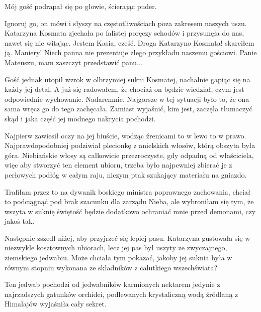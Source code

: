 Mój gość podrapał się po głowie, ścierając puder.

\begin{dialogue}
\ds{} Ignoruj go, on mówi i słyszy na częstotliwościach poza zakresem naszych uszu. \dm{} Katarzyna Kosmata zjechała po falistej poręczy schodów i przysunęła do nas, nawet się nie witając.
\dm{} Jestem Kasia, cześć.
\ds{} Droga Katarzyno Kosmata! \dm{} skarciłem ją. \dm{} Maniery! Niech panna nie prezentuje złego przykładu naszemu gościowi. Panie Mateuszu, mam zaszczyt przedstawić panu...
\end{dialogue}

Gość jednak utopił wzrok w olbrzymiej sukni Kosmatej, nachalnie gapiąc się na każdy jej detal.
A już się radowałem, że chociaż on będzie wiedział, czym jest odpowiednie wychowanie. Nadaremnie.
Najgorsze w tej sytuacji było to, że ona sama wręcz go do tego zachęcała. 
Zamiast wyjaśnić, kim jest, zaczęła tłumaczyć skąd i jaka część jej modnego nakrycia pochodzi.

Najpierw zawiesił oczy na jej biuście, wodząc źrenicami to w lewo to w prawo.
Najprawdopodobniej podziwiał plecionkę z anielskich włosów, którą obszyta była góra.
Niebiańskie włosy są całkowicie przezroczyste, gdy odpadną od właściciela, więc
aby stworzyć ten element ubioru, trzeba było najpewniej zbierać je z perłowych podłóg w całym raju, niczym ptak szukający materiału na gniazdo.
\begin{dialogue}
\ds{} Trafiłam przez to na dywanik boskiego ministra poprawnego zachowania, chciał to podciągnąć pod brak szacunku dla zarządu Nieba, ale wybroniłam się tym, że wszyta w suknię świętość
będzie dodatkowo ochraniać mnie przed demonami, czy jakoś tak.
\end{dialogue}

Następnie zszedł niżej, aby przyjrzeć się lepiej pasu.
Katarzyna gustowała się w niezwykle kosztownych ubiorach, lecz jej pas był uszyty ze zwyczajnego, ziemskiego jedwabiu.
Może chciała tym pokazać, jakoby jej suknia była w równym stopniu wykonana ze składników z calutkiego wszechświata?
\begin{dialogue}
\ds{} Ten jedwab pochodzi od jedwabników karmionych nektarem jedynie z najrzadszych gatunków orchidei, podlewanych krystaliczną wodą źródlaną z Himalajów
\dm{} wyjaśniła cały sekret.
\end{dialogue}

